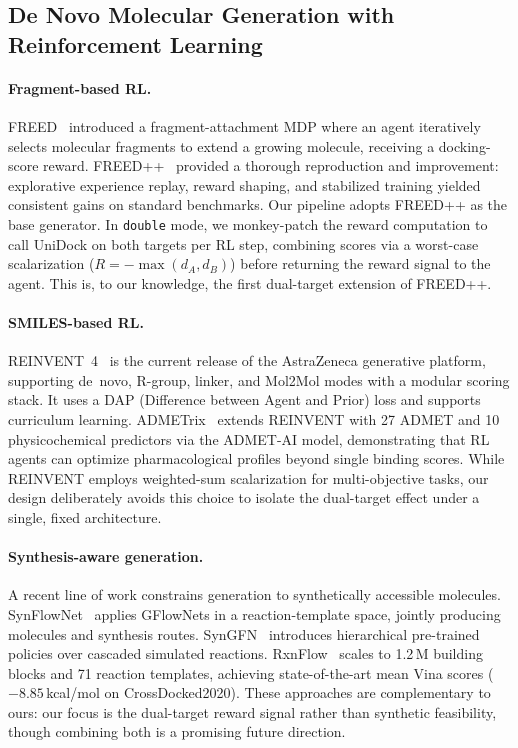 \subsection{De Novo Molecular Generation with Reinforcement Learning}
\label{sec:rw:rlgen}

\paragraph{Fragment-based RL.}
FREED~\citep{yang2021freed} introduced a fragment-attachment MDP where an
agent iteratively selects molecular fragments to extend a growing molecule,
receiving a docking-score reward.
FREED++~\citep{telepov2023freedpp} provided a thorough reproduction and
improvement: explorative experience replay, reward shaping, and stabilized
training yielded consistent gains on standard benchmarks.
Our pipeline adopts FREED++ as the base generator.
In \texttt{double} mode, we monkey-patch the reward computation to call
UniDock on both targets per RL step, combining scores via a worst-case
scalarization ($R = -\max(d_A, d_B)$) before returning the reward signal
to the agent.  This is, to our knowledge, the first dual-target extension
of FREED++.

\paragraph{SMILES-based RL.}
REINVENT~4~\citep{loeffler2024reinvent4} is the current release of the
AstraZeneca generative platform, supporting de~novo, R-group, linker,
and Mol2Mol modes with a modular scoring stack.
It uses a DAP (Difference between Agent and Prior) loss and supports
curriculum learning.
ADMETrix~\citep{mourdoukoutas2025admetrix} extends REINVENT with 27 ADMET
and 10 physicochemical predictors via the ADMET-AI model, demonstrating
that RL agents can optimize pharmacological profiles beyond single
binding scores.
While REINVENT employs weighted-sum scalarization for multi-objective
tasks, our design deliberately avoids this choice to isolate the
dual-target effect under a single, fixed architecture.

\paragraph{Synthesis-aware generation.}
A recent line of work constrains generation to synthetically accessible
molecules.
SynFlowNet~\citep{cretu2025synflownet} applies GFlowNets in a
reaction-template space, jointly producing molecules and synthesis
routes.
SynGFN~\citep{kim2025syngfn} introduces hierarchical pre-trained policies
over cascaded simulated reactions.
RxnFlow~\citep{lee2025rxnflow} scales to 1.2\,M building blocks and 71
reaction templates, achieving state-of-the-art mean Vina scores
($-8.85$\,kcal/mol on CrossDocked2020).
These approaches are complementary to ours: our focus is the
dual-target reward signal rather than synthetic feasibility, though
combining both is a promising future direction.

